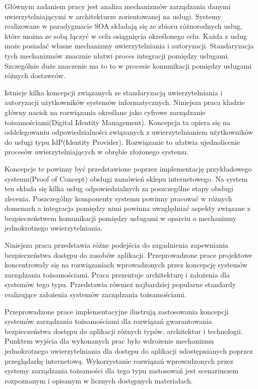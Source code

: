 	Głównym zadaniem pracy jest analiza mechanizmów zarządzania danymi uwierzytelniającymi w architekturze zorientowanej na usługi. Systemy realizowane w paradygmacie SOA składają się ze zbioru różnorodnych usług, które można ze sobą łączyć w celu osiągnięcia określonego celu. Każda z usług może posiadać własne mechanizmy uwierzytelniania i autoryzacji. Standaryzacja tych mechanizmów znacznie ułatwi proces integracji pomiędzy usługami. Szczególnie duże znaczenie ma to to w procesie komunikacji pomiędzy usługami różnych dostawców. 

	Istnieje kilka koncepcji związanych ze standaryzacją uwierzytelniania i autoryzacji użytkowników systemów informatycznych. Niniejsza praca kładzie główny nacisk na rozwiązania określane jako cyfrowe zarządzanie tożsamościami(Digital Identity Management). Koncepcja ta opiera się na oddelegowaniu odpowiedzialności związanych z uwierzytelnianiem użytkowników do usługi typu IdP(Identity Provider). Rozwiązanie to ułatwia ujednolicenie procesów uwierzytelniających w obrębie złożonego systemu.

	Koncepcje te powinny być przedstawione poprzez implementację przykładowego systemu(Proof of Concept) obsługi zamówień sklepu internetowego. Na system ten składa się kilka usług odpowiedzialnych za poszczególne etapy obsługi zlecenia. Poszczególny komponenty systemu powinny pracować w różnych domenach a integracja pomiędzy nimi powinna uwzględniać aspekty związane z bezpieczeństwem komunikacji pomiędzy usługami w oparciu o mechanizmy jednokrotnego uwierzytelniania.


\label{sec:osiagnieciaPracy}

	Niniejsza praca przedstawia różne podejścia do zagadnienia zapewniania bezpieczeństwa dostępu do zasobów aplikacji. Przeprowadzone prace projektowe koncentrowały się na rozwiązaniach wprowadzonych przez koncepcję systemów zarządzania tożsamościami. Praca prezentuje architekturę i założenia dla systemów tego typu. Przedstawia również najbardziej popularne standardy realizujące założenia systemów zarządzania tożsamościami.

	Przeprowadzone prace implementacyjne ilustrują zastosowania koncepcji systemów zarządzania tożsamościami dla rozwiązań gwarantowania bezpieczeństwa dostępu do aplikacji różnych typów, architektur i technologii. Punktem wyjścia dla wykonanych prac było wdrożenie mechanizmu jednokrotnego uwierzytelniania dla dostępu do aplikacji udostępnianych poprzez przeglądarkę internetową. Wykorzystanie rozwiązań wprowadzonych przez systemy zarządzania tożsamości dla tego typu zastosowań jest scenariuszem rozpoznanym i opisanym w licznych dostępnych materiałach.

